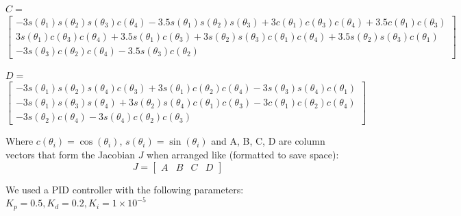 \documentclass[11pt]{article}
\begin{document}
\begin{center}
    \textbf{$C =$}
    \[\left[\begin{matrix}- 3 s{\left(\theta_{1} \right)} s{\left(\theta_{2} \right)} s{\left(\theta_{3} \right)} c{\left(\theta_{4} \right)} - 3.5 s{\left(\theta_{1} \right)} s{\left(\theta_{2} \right)} s{\left(\theta_{3} \right)} + 3 c{\left(\theta_{1} \right)} c{\left(\theta_{3} \right)} c{\left(\theta_{4} \right)} + 3.5 c{\left(\theta_{1} \right)} c{\left(\theta_{3} \right)}\\3 s{\left(\theta_{1} \right)} c{\left(\theta_{3} \right)} c{\left(\theta_{4} \right)} + 3.5 s{\left(\theta_{1} \right)} c{\left(\theta_{3} \right)} + 3 s{\left(\theta_{2} \right)} s{\left(\theta_{3} \right)} c{\left(\theta_{1} \right)} c{\left(\theta_{4} \right)} + 3.5 s{\left(\theta_{2} \right)} s{\left(\theta_{3} \right)} c{\left(\theta_{1} \right)}\\- 3 s{\left(\theta_{3} \right)} c{\left(\theta_{2} \right)} c{\left(\theta_{4} \right)} - 3.5 s{\left(\theta_{3} \right)} c{\left(\theta_{2} \right)}\end{matrix}\right]\]

    \textbf{$D =$}
    \[\left[\begin{matrix}- 3 s{\left(\theta_{1} \right)} s{\left(\theta_{2} \right)} s{\left(\theta_{4} \right)} c{\left(\theta_{3} \right)} + 3 s{\left(\theta_{1} \right)} c{\left(\theta_{2} \right)} c{\left(\theta_{4} \right)} - 3 s{\left(\theta_{3} \right)} s{\left(\theta_{4} \right)} c{\left(\theta_{1} \right)}\\- 3 s{\left(\theta_{1} \right)} s{\left(\theta_{3} \right)} s{\left(\theta_{4} \right)} + 3 s{\left(\theta_{2} \right)} s{\left(\theta_{4} \right)} c{\left(\theta_{1} \right)} c{\left(\theta_{3} \right)} - 3 c{\left(\theta_{1} \right)} c{\left(\theta_{2} \right)} c{\left(\theta_{4} \right)}\\- 3 s{\left(\theta_{2} \right)} c{\left(\theta_{4} \right)} - 3 s{\left(\theta_{4} \right)} c{\left(\theta_{2} \right)} c{\left(\theta_{3} \right)}\end{matrix}\right]\]
\end{center}

Where $c(\theta_i)=\cos(\theta_i)$, $s(\theta_i)=\sin(\theta_i)$ and A, B, C, D are column vectors that form the Jacobian \(J\) when arranged like (formatted to save space):
\[J = \left[\begin{matrix} A & B & C & D \end{matrix}\right]\]

We used a PID controller with the following parameters: $K_p = 0.5, K_d = 0.2, K_i = 1 \times 10^{-5}$
\end{document}
